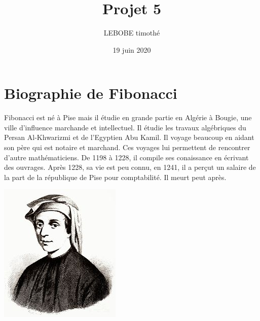 \documentclass{article}
\title{Projet 5}
\author{LEBOBE timothé}
\date{19 juin 2020}
\begin{document}
    \maketitle
    \newpage

    \tableofcontents
    \newpage

    \section{Biographie de Fibonacci}
        Fibonacci est né à Pise mais il étudie en grande partie en Algérie à Bougie, une ville d'influence marchande et intellectuel.
        Il étudie les travaux algébriques du Persan Al-Khwarizmi et de l'Egyptien Abu Kamil. Il voyage beaucoup en aidant son père qui est
        notaire et marchand. Ces voyages lui permettent de rencontrer d'autre mathématiciens. De 1198 à 1228, il compile ses conaissance 
        en écrivant des ouvrages. Après 1228, sa vie est peu connu, en 1241, il a perçut un salaire de la part de la république de Pise
        pour comptabilité. Il meurt peut après.
        \begin{center}
            \includegraphics{images/Fibonacci_portrait.jpg}
        \end{center}

        \newpage
\end{document}
